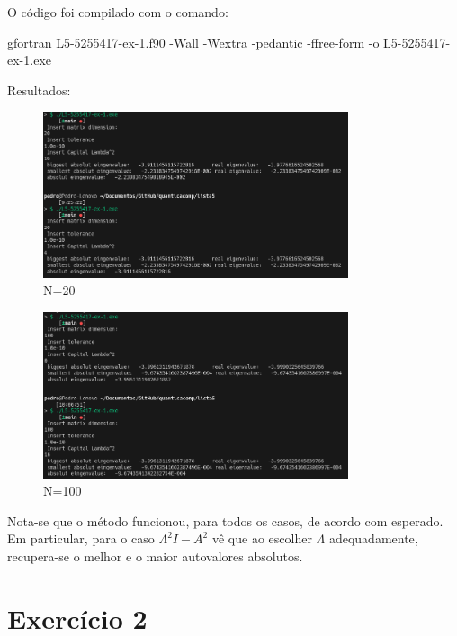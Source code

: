 \documentclass[12pt, a4paper]{article} %
\begin{document}
        O c\'odigo foi compilado com o comando:

    gfortran L5-5255417-ex-1.f90 -Wall -Wextra -pedantic -ffree-form -o L5-5255417-ex-1.exe  

        Resultados:

        \begin{figure}[H]
            \centering
            \includegraphics[width=0.8\textwidth]{../images/ex1-20.png}
            \caption{N=20}
        \end{figure}
        \begin{figure}[H]
            \centering
            \includegraphics[width=0.8\textwidth]{../images/ex1-100.png}
            \caption{N=100}
        \end{figure}

        Nota-se que o método funcionou, para todos os casos, de acordo com esperado. Em particular, para o caso $\Lambda^2 I - A^2$ v\^e que ao escolher $\Lambda$ adequadamente, recupera-se o melhor e o maior autovalores absolutos.

        \section*{Exercício 2}
\end{document}
